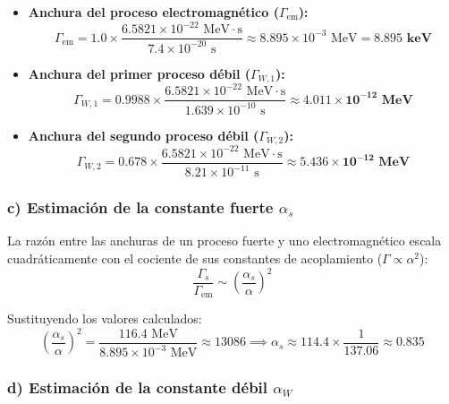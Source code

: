 \begin{problema}
\begin{itemize}
    \item \textbf{Anchura del proceso electromagnético ($\Gamma_{\text{em}}$):}
    \begin{equation*}
        \Gamma_{\text{em}} = 1.0 \times \frac{6.5821 \times 10^{-22} \text{ MeV}\cdot\text{s}}{7.4 \times 10^{-20} \text{ s}} \approx 8.895 \times 10^{-3} \text{ MeV} = \mathbf{8.895 \text{ keV}}
    \end{equation*}

    \item \textbf{Anchura del primer proceso débil ($\Gamma_{W,1}$):}
    \begin{equation*}
        \Gamma_{W,1} = 0.9988 \times \frac{6.5821 \times 10^{-22} \text{ MeV}\cdot\text{s}}{1.639 \times 10^{-10} \text{ s}} \approx \mathbf{4.011 \times 10^{-12} \text{ MeV}}
    \end{equation*}

    \item \textbf{Anchura del segundo proceso débil ($\Gamma_{W,2}$):}
    \begin{equation*}
        \Gamma_{W,2} = 0.678 \times \frac{6.5821 \times 10^{-22} \text{ MeV}\cdot\text{s}}{8.21 \times 10^{-11} \text{ s}} \approx \mathbf{5.436 \times 10^{-12} \text{ MeV}}
    \end{equation*}
\end{itemize}

\subsubsection*{c) Estimación de la constante fuerte $\alpha_s$}

La razón entre las anchuras de un proceso fuerte y uno electromagnético escala cuadráticamente con el cociente de sus constantes de acoplamiento ($\Gamma \propto \alpha^2$):
\begin{equation*}
    \frac{\Gamma_s}{\Gamma_{\text{em}}} \sim \left( \frac{\alpha_s}{\alpha} \right)^2
\end{equation*}

Sustituyendo los valores calculados:
\begin{equation*}
    \left( \frac{\alpha_s}{\alpha} \right)^2 = \frac{116.4 \text{ MeV}}{8.895 \times 10^{-3} \text{ MeV}} \approx 13086 \implies \alpha_s \approx 114.4 \times \frac{1}{137.06} \approx \mathbf{0.835}
\end{equation*}

\subsubsection*{d) Estimación de la constante débil $\alpha_W$}


\end{problema}
